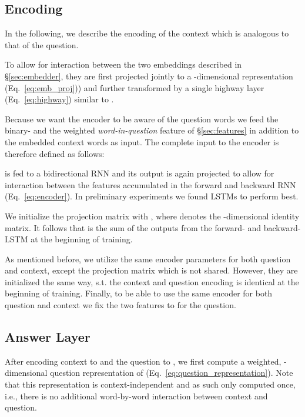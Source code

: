 \documentclass[11pt,a4paper]{article}
\begin{document}
\subsection{Encoding}

In the following, we describe the encoding of the context which is analogous to that of the question. 

To allow for interaction between the two embeddings described in \S\ref{sec:embedder}, they are first projected jointly to a -dimensional representation (Eq.~\ref{eq:emb_proj})) and further transformed by a single highway layer (Eq.~\ref{eq:highway}) similar to .



Because we want the encoder to be aware of the question words we feed the binary- and the weighted \textit{word-in-question} feature of \S\ref{sec:features} in addition to the embedded context words as input. The complete input  to the encoder is therefore defined as follows:


 is fed to a bidirectional RNN and its output is again projected to allow for interaction between the features accumulated in the forward and backward RNN (Eq.~\ref{eq:encoder}). In preliminary experiments we found LSTMs \cite{Hochreiter1997} to perform best.



We initialize the projection matrix  with , where  denotes the -dimensional identity matrix. It follows that  is the sum of the outputs from the forward- and backward-LSTM at the beginning of training.

As mentioned before, we utilize the same encoder parameters for both question and context, except the projection matrix  which is not shared. However, they are initialized the same way, s.t. the context and question encoding is identical at the beginning of training. Finally, to be able to use the same encoder for both question and context we fix the two  features to  for the question. 

\subsection{Answer Layer}

After encoding context  to  and the question  to , we first compute a weighted, -dimensional question representation  of  (Eq.~\ref{eq:question_representation}). Note that this representation is context-independent and as such only computed once, i.e., there is no additional word-by-word interaction between context and question.
\end{document}
